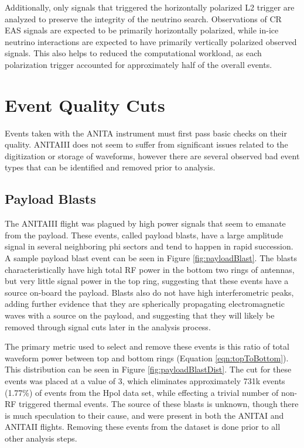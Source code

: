 		Additionally, only signals that triggered the horizontally polarized L2 trigger are analyzed to preserve the integrity of the neutrino search.  Observations of CR EAS signals are expected to be primarily horizontally polarized, while in-ice neutrino interactions are expected to have primarily vertically polarized observed signals.  This also helps to reduced the computational workload, as each polarization trigger accounted for approximately half of the overall events.
		
			
\section{Event Quality Cuts}
	Events taken with the ANITA instrument must first pass basic checks on their quality.  ANITAIII does not seem to suffer from significant issues related to the digitization or storage of waveforms, however there are several observed bad event types that can be identified and removed prior to analysis.

	\subsection{Payload Blasts}
		The ANITAIII flight was plagued by high power signals that seem to emanate from the payload.  These events, called payload blasts, have a large amplitude signal in several neighboring phi sectors and tend to happen in rapid succession.  A sample payload blast event can be seen in Figure \ref{fig:payloadBlast}.  The blasts characteristically have high total RF power in the bottom two rings of antennas, but very little signal power in the top ring, suggesting that these events have a source on-board the payload.  Blasts also do not have high interferometric peaks, adding further evidence that they are spherically propagating electromagnetic waves with a source on the payload, and suggesting that they will likely be removed through signal cuts later in the analysis process.
		
		The primary metric used to select and remove these events is this ratio of total waveform power between top and bottom rings (Equation \ref{eqn:topToBottom}). This distribution can be seen in Figure \ref{fig:payloadBlastDist}.  The cut for these events was placed at a value of 3, which eliminates approximately 731k  events (1.77\%) of events from the Hpol data set, while effecting a trivial number of non-RF triggered thermal events.  The source of these blasts is unknown, though there is much speculation to their cause, and were present in both the ANITAI and ANITAII flights.  Removing these events from the dataset is done prior to all other analysis steps.  
		
